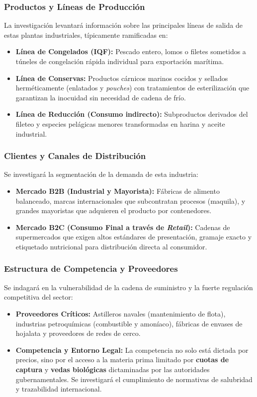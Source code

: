 \documentclass[11pt,a4paper]{article}
\begin{document}
\subsubsection{Productos y Líneas de Producción}
La investigación levantará información sobre las principales líneas de salida de estas plantas industriales, típicamente ramificadas en:
\begin{itemize}[noitemsep]
    \item \textbf{Línea de Congelados (IQF):} Pescado entero, lomos o filetes sometidos a túneles de congelación rápida individual para exportación marítima.
    \item \textbf{Línea de Conservas:} Productos cárnicos marinos cocidos y sellados herméticamente (enlatados y \textit{pouches}) con tratamientos de esterilización que garantizan la inocuidad sin necesidad de cadena de frío.
    \item \textbf{Línea de Reducción (Consumo indirecto):} Subproductos derivados del fileteo y especies pelágicas menores transformadas en harina y aceite industrial.
\end{itemize}

\subsubsection{Clientes y Canales de Distribución}
Se investigará la segmentación de la demanda de esta industria:
\begin{itemize}[noitemsep]
    \item \textbf{Mercado B2B (Industrial y Mayorista):} Fábricas de alimento balanceado, marcas internacionales que subcontratan procesos (maquila), y grandes mayoristas que adquieren el producto por contenedores.
    \item \textbf{Mercado B2C (Consumo Final a través de \textit{Retail}):} Cadenas de supermercados que exigen altos estándares de presentación, gramaje exacto y etiquetado nutricional para distribución directa al consumidor.
\end{itemize}

\subsubsection{Estructura de Competencia y Proveedores}
Se indagará en la vulnerabilidad de la cadena de suministro y la fuerte regulación competitiva del sector:
\begin{itemize}[noitemsep]
    \item \textbf{Proveedores Críticos:} Astilleros navales (mantenimiento de flota), industrias petroquímicas (combustible y amoníaco), fábricas de envases de hojalata y proveedores de redes de cerco.
    \item \textbf{Competencia y Entorno Legal:} La competencia no solo está dictada por precios, sino por el acceso a la materia prima limitado por \textbf{cuotas de captura} y \textbf{vedas biológicas} dictaminadas por las autoridades gubernamentales. Se investigará el cumplimiento de normativas de salubridad y trazabilidad internacional.
\end{itemize}
\end{document}
